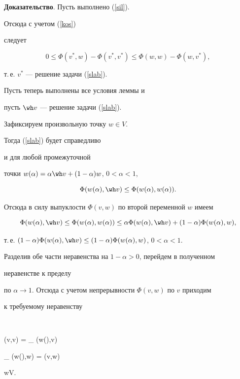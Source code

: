 {\bf Доказательство}. Пусть выполнено (\ref{sil}).


Отсюда с учетом (\ref{kos})


следует


$$


0\le\Phi(v^*,w)-\Phi(v^*,v^*)\le\Phi(w,w)-\Phi(w,v^*),


$$


т.\,е. $v^*$ --- решение задачи (\ref{slab}).





Пусть теперь выполнены все условия леммы и


пусть $\wh v$ --- решение задачи (\ref{slab}).


Зафиксируем произвольную точку $w\in V$.


Тогда (\ref{slab})  будет справедливо


и для любой промежуточной


точки $w(\alpha)=\alpha \wh v + (1-\alpha) w$, $0<\alpha<1$,


$$


\Phi(w(\alpha),\wh v)\le\Phi(w(\alpha),w(\alpha)).


$$


Отсюда в силу выпуклости $\Phi(v,w)$ по второй переменной $w$ имеем


$$


\Phi(w(\alpha),\wh v)\le\Phi(w(\alpha),w(\alpha))\le


\alpha \Phi(w(\alpha),\wh v)+


(1-\alpha)\Phi(w(\alpha),w),


$$


т.\,е. $(1-\alpha)\Phi(w(\alpha),\wh v)\le


(1-\alpha) \Phi(w(\alpha),w)$, $0< \alpha<1$.





Разделив обе части неравенства на $1-\alpha>0$, перейдем в полученном


неравенстве к пределу


по $\alpha\to 1$. Отсюда с учетом непрерывности $\Phi(v,w)$ по $v$ приходим


к требуемому неравенству


$$


\Phi(\wh v,\wh v) = \lim_{\alpha{}} \Phi(w(\alpha),\wh v)\le


\lim_{\alpha{}} \Phi(w(\alpha),w) = \Phi(\wh v,w)\quad\forall


w\in V. \qquad \square


